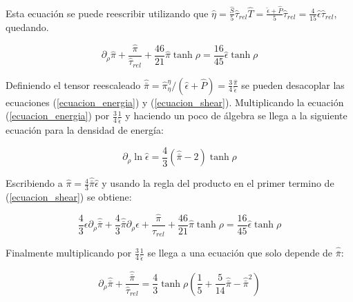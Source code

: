\documentclass[11pt,a4paper]{article}
\begin{document}
Esta ecuación se puede reescribir utilizando que $\hat{\eta}=\frac{\hat{S}}{5}\hat{\tau}_{rel}\hat{T}=\frac{\hat{\epsilon}+\hat{P}}{5}\hat{\tau}_{rel}=\frac{4}{15}\hat{\epsilon}\hat{\tau}_{rel}$, quedando.

\begin{equation}
\partial_{\rho}\hat{\pi}+\frac{\hat{\pi}}{\hat{\tau}_{rel}}
+\frac{46}{21}\hat{\pi}\tanh\rho=
\frac{16}{45}\hat{\epsilon}\tanh\rho
\label{ecuacion_shear}
\end{equation}

Definiendo el tensor reescaleado $\hat{\bar{\pi}}=\hat{\pi}^{\eta}_{\eta}/(\hat{\epsilon}+\hat{P})=\frac{3}{4}\frac{\hat{\pi}}{\hat{\epsilon}}$ se pueden desacoplar las ecuaciones (\ref{ecuacion_energia}) y (\ref{ecuacion_shear}). Multiplicando la ecuación (\ref{ecuacion_energia}) por $\frac{3}{4}\frac{1}{\hat{\epsilon}}$ y haciendo un poco de álgebra se llega a la siguiente ecuación para la densidad de energía:

\begin{equation}
\partial_{\rho}\ln\hat{\epsilon}=
\frac{4}{3}(\hat{\bar{\pi}}-2)\tanh\rho
\end{equation}

Escribiendo a $\hat{\pi}=\frac{4}{3}\hat{\bar{\pi}}\hat{\epsilon}$ y usando la regla del producto en el primer termino de (\ref{ecuacion_shear}) se obtiene:

\begin{equation}
\frac{4}{3}\epsilon\partial_{\rho}\hat{\bar{\pi}}
+\frac{4}{3}\hat{\bar{\pi}}\partial_{\rho}\epsilon
+\frac{\hat{\pi}}{\hat{\tau}_{rel}}
+\frac{46}{21}\hat{\pi}\tanh\rho=
\frac{16}{45}\hat{\epsilon}\tanh\rho
\end{equation}

Finalmente multiplicando por $\frac{3}{4}\frac{1}{\hat{\epsilon}}$ se llega a una ecuación que solo depende de $\hat{\bar{\pi}}$:

\begin{equation}
\partial_{\rho}\hat{\bar{\pi}}+\frac{\hat{\bar{\pi}}}{\hat{\tau}_{rel}}=
\frac{4}{3}\tanh\rho(\frac{1}{5}+\frac{5}{14}\hat{\bar{\pi}}-\hat{\bar{\pi}}^2)
\end{equation}












\end{document}
